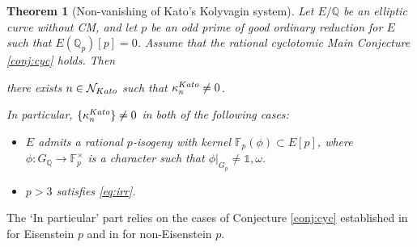\documentclass[10pt,reqno]{amsart}
\numberwithin{equation}{section}
\theoremstyle{plain}
\theoremstyle{definition}
\theoremstyle{definition}
\theoremstyle{plain}
\theoremstyle{plain}
\theoremstyle{plain}
\theoremstyle{plain}
\theoremstyle{plain}
\newtheorem{thmintro}{Theorem}
\theoremstyle{plain}
\newcommand{\Z}{\mathbb{Z}}
\newcommand{\Q}{\mathbb{Q}}
\begin{document}
\begin{thmintro}[Non-vanishing of Kato's Kolyvagin system]\label{thmintroKato}
Let $E/\Q$ be an elliptic curve without CM, and let $p$ be an odd prime of good ordinary reduction for $E$ such that $E(\Q_p)[p]=0$. Assume that the rational cyclotomic Main Conjecture \ref{conj:cyc} holds.  %
Then 
\begin{center}
there exists $n\in \mathcal{N}_{\rm Kato}$ such that $\kappa_{n}^{\rm Kato}\neq 0$. 
\end{center}
In particular, $\{\kappa_{n}^{\rm Kato}\}\neq 0$ in both of the following cases:
\begin{itemize}
\item[$\circ$] $E$ admits a rational $p$-isogeny with kernel $\mathbb{F}_p(\phi)\subset E[p]$, where $\phi:G_\Q \to \mathbb{F}_p^{\times}$ is a character such that $\phi|_{G_p}\neq\mathds{1},\omega$. 
\item[$\circ$] $p>3$ satisfies \eqref{eq:irr}.
\end{itemize}
\end{thmintro}
The `In particular' part relies on the cases of Conjecture \ref{conj:cyc} established in \cite{kato-euler-systems,eisenstein_cyc} for Eisenstein $p$ and in \cite{kato-euler-systems,skinner-urban,wan-hilbert} for non-Eisenstein $p$.
\end{document}

